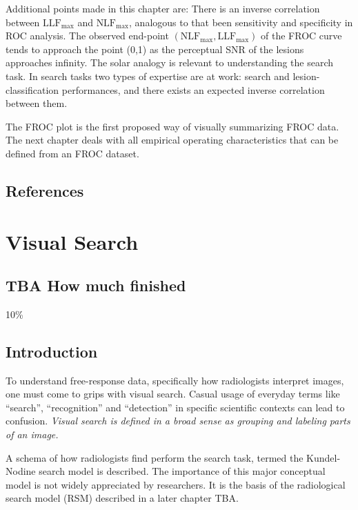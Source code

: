 \documentclass[
]{book}
\begin{document}
Additional points made in this chapter are: There is an inverse correlation between \(\text{LLF}_{\text{max}}\) and \(\text{NLF}_{\text{max}}\), analogous to that been sensitivity and specificity in ROC analysis. The observed end-point \((\text{NLF}_{\text{max}}, \text{LLF}_{\text{max}})\) of the FROC curve tends to approach the point (0,1) as the perceptual SNR of the lesions approaches infinity. The solar analogy is relevant to understanding the search task. In search tasks two types of expertise are at work: search and lesion-classification performances, and there exists an expected inverse correlation between them.

The FROC plot is the first proposed way of visually summarizing FROC data. The next chapter deals with all empirical operating characteristics that can be defined from an FROC dataset.

\hypertarget{froc-paradigm-references}{%
\section{References}\label{froc-paradigm-references}}

\hypertarget{visual-search}{%
\chapter{Visual Search}\label{visual-search}}

\hypertarget{visual-search-how-much-finished}{%
\section{TBA How much finished}\label{visual-search-how-much-finished}}

10\%

\hypertarget{visual-search-intro}{%
\section{Introduction}\label{visual-search-intro}}

To understand free-response data, specifically how radiologists interpret images, one must come to grips with visual search. Casual usage of everyday terms like ``search'', ``recognition'' and ``detection'' in specific scientific contexts can lead to confusion.
\emph{Visual search is defined in a broad sense as grouping and labeling parts of an image.}

A schema of how radiologists find perform the search task, termed the Kundel-Nodine search model is described. The importance of this major conceptual model is not widely appreciated by researchers. It is the basis of the radiological search model (RSM) described in a later chapter TBA.
\end{document}
